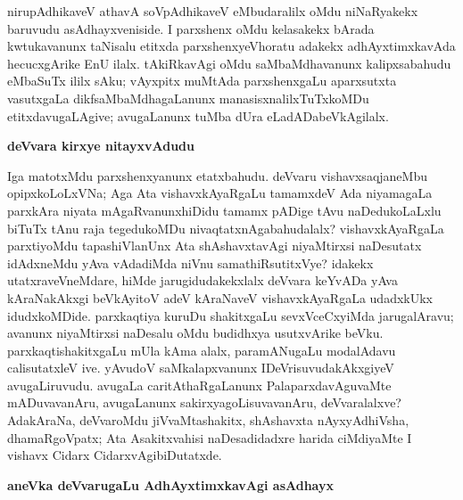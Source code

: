 niru\-pAdhikaveV athavA soVpAdhikaveV eMbudaralilx oMdu niNaRyakekx baruvudu asAdhayx\-veniside. I parxshenx oMdu kelasakekx bArada kwtukavanunx taNisalu etitxda parxshenxyeV\break horatu adakekx adhAyxtimxkavAda hecucxgArike EnU ilalx. tAkiRkavAgi oMdu saMbaMdha\-vanunx kalipxsabahudu eMbaSuTx ililx sAku; vAyxpitx muMtAda parxshenxgaLu aparxsutxta vasutxgaLa dikfsaMbaMdhagaLanunx manasisxnalilxTuTxkoMDu etitxdavugaLAgive; avugaLanunx tuMba dUra eLadADabeVkAgilalx.

\bigskip
\begin{center}
{\Large\bf deVvara kirxye nitayxvAdudu}
\end{center}

Iga matotxMdu parxshenxyanunx etatxbahudu. deVvaru vishavxsaqjaneMbu opipx\-koLoLxVNa; Aga Ata vishavxkAyaRgaLu tamamxdeV Ada niyamagaLa parxkAra niyata mAgaRvanunx\break hiDidu tamamx pADige tAvu naDedukoLaLxlu biTuTx tAnu raja tegedukoMDu nivaqtatx\-nAgabahudalalx? vishavxkAyaRgaLa parxtiyoMdu tapashiVlanUnx Ata shAshavxtavAgi niyaMtirxsi naDesutatx idAdxneMdu yAva vAdadiMda niVnu samathiRsutitxVye? idakekx utatxra\-veVneMdare, hiMde jarugidudakekxlalx deVvara keYvADa yAva kAraNakAkxgi beVkAyitoV adeV kAraNaveV vishavxkAyaRgaLa udadxkUkx idudxkoMDide. parxkaqtiya kuruDu shakitxgaLu sevxVceCxyiMda jarugalAravu; avanunx niyaMtirxsi naDesalu oMdu budidhxya usutxvArike beVku. parxkaqtishakitxgaLu mUla kAma alalx, paramANugaLu modalAdavu calisutatxleV ive. yAvudoV saMkalapxvanunx IDeVrisuvudakAkxgiyeV avugaLiruvudu. avugaLa caritAthaRgaLanunx PalaparxdavAguvaMte mADuvavanAru, avugaLanunx sakirxyagoLisu\-vavanAru, deVvaralalxve? AdakAraNa, deVvaroMdu jiVvaMtashakitx, shAshavxta nAyxyAdhiVsha, dhamaRgoVpatx; Ata Asakitxvahisi naDesadidadxre harida ciMdiyaMte I vishavx Cidarx Cidarx\-vAgibiDutatxde.

\bigskip
\begin{center}
{\Large\bf aneVka deVvarugaLu AdhAyxtimxkavAgi asAdhayx}
\end{center}

